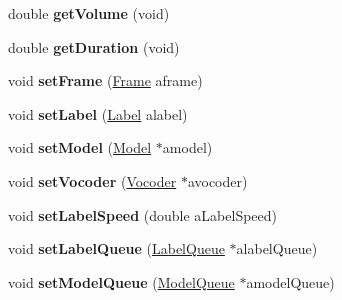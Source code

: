 \begin{DoxyCompactItemize}
\item 
\hypertarget{class_m_a_g_e_1_1_mage_ab2d2a99d80b9e44fb31edc013acf10c2}{double {\bfseries get\-Volume} (void)}\label{class_m_a_g_e_1_1_mage_ab2d2a99d80b9e44fb31edc013acf10c2}

\item 
\hypertarget{class_m_a_g_e_1_1_mage_a82621924af342fa5aeee62a75491b3cc}{double {\bfseries get\-Duration} (void)}\label{class_m_a_g_e_1_1_mage_a82621924af342fa5aeee62a75491b3cc}

\item 
\hypertarget{class_m_a_g_e_1_1_mage_ac7bf18d62123a16be7062332ff9e4199}{void {\bfseries set\-Frame} (\hyperlink{struct_m_a_g_e_1_1_frame}{Frame} aframe)}\label{class_m_a_g_e_1_1_mage_ac7bf18d62123a16be7062332ff9e4199}

\item 
\hypertarget{class_m_a_g_e_1_1_mage_aec2890ec81154a590c43771fcbc5c01f}{void {\bfseries set\-Label} (\hyperlink{class_m_a_g_e_1_1_label}{Label} alabel)}\label{class_m_a_g_e_1_1_mage_aec2890ec81154a590c43771fcbc5c01f}

\item 
\hypertarget{class_m_a_g_e_1_1_mage_a5b5483ba34fdc6fe9c8f120737ad8e5f}{void {\bfseries set\-Model} (\hyperlink{class_m_a_g_e_1_1_model}{Model} $\ast$amodel)}\label{class_m_a_g_e_1_1_mage_a5b5483ba34fdc6fe9c8f120737ad8e5f}

\item 
\hypertarget{class_m_a_g_e_1_1_mage_a40e130dd62fecb5039f1228b6bdc2464}{void {\bfseries set\-Vocoder} (\hyperlink{class_m_a_g_e_1_1_vocoder}{Vocoder} $\ast$avocoder)}\label{class_m_a_g_e_1_1_mage_a40e130dd62fecb5039f1228b6bdc2464}

\item 
\hypertarget{class_m_a_g_e_1_1_mage_a7f8dabb44a06ecee3abde35842ffe48e}{void {\bfseries set\-Label\-Speed} (double a\-Label\-Speed)}\label{class_m_a_g_e_1_1_mage_a7f8dabb44a06ecee3abde35842ffe48e}

\item 
\hypertarget{class_m_a_g_e_1_1_mage_a9b17d63eb3d7e5056fc1e07341abe15a}{void {\bfseries set\-Label\-Queue} (\hyperlink{class_m_a_g_e_1_1_label_queue}{Label\-Queue} $\ast$alabel\-Queue)}\label{class_m_a_g_e_1_1_mage_a9b17d63eb3d7e5056fc1e07341abe15a}

\item 
\hypertarget{class_m_a_g_e_1_1_mage_ab2035e9b0d1ba9b37487f8d89933c61a}{void {\bfseries set\-Model\-Queue} (\hyperlink{class_m_a_g_e_1_1_model_queue}{Model\-Queue} $\ast$amodel\-Queue)}\label{class_m_a_g_e_1_1_mage_ab2035e9b0d1ba9b37487f8d89933c61a}


\end{DoxyCompactItemize}
